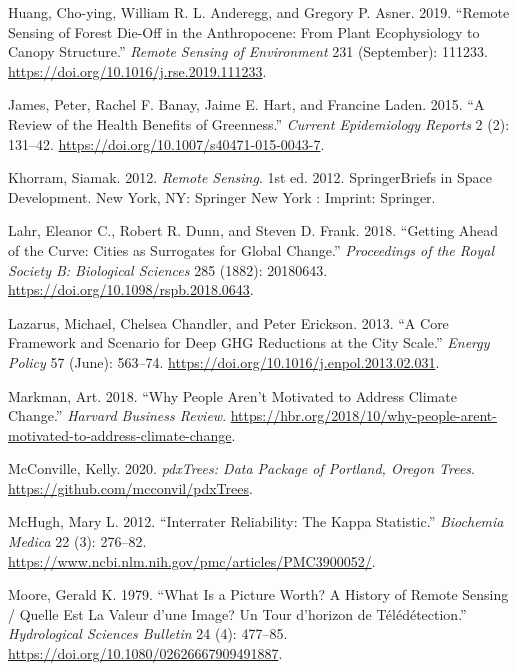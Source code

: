 \documentclass[12pt,twoside]{reedthesis}
\newlength{\cslhangindent}
\newenvironment{CSLReferences}[2] %
 {%
  \setlength{\parindent}{0pt}
  \ifodd #1 \everypar{\setlength{\hangindent}{\cslhangindent}}\ignorespaces\fi
  \ifnum #2 > 0
  \setlength{\parskip}{#2\baselineskip}
  \fi
 }%
 {}
\begin{document}
\begin{CSLReferences}{1}{0}
\leavevmode{}%
Huang, Cho-ying, William R. L. Anderegg, and Gregory P. Asner. 2019. {``Remote Sensing of Forest Die-Off in the Anthropocene: From Plant Ecophysiology to Canopy Structure.''} \emph{Remote Sensing of Environment} 231 (September): 111233. \url{https://doi.org/10.1016/j.rse.2019.111233}.

\leavevmode{}%
James, Peter, Rachel F. Banay, Jaime E. Hart, and Francine Laden. 2015. {``A Review of the Health Benefits of Greenness.''} \emph{Current Epidemiology Reports} 2 (2): 131--42. \url{https://doi.org/10.1007/s40471-015-0043-7}.

\leavevmode{}%
Khorram, Siamak. 2012. \emph{Remote Sensing}. 1st ed. 2012. SpringerBriefs in Space Development. New York, NY: Springer New York : Imprint: Springer.

\leavevmode{}%
Lahr, Eleanor C., Robert R. Dunn, and Steven D. Frank. 2018. {``Getting Ahead of the Curve: Cities as Surrogates for Global Change.''} \emph{Proceedings of the Royal Society B: Biological Sciences} 285 (1882): 20180643. \url{https://doi.org/10.1098/rspb.2018.0643}.

\leavevmode{}%
Lazarus, Michael, Chelsea Chandler, and Peter Erickson. 2013. {``A Core Framework and Scenario for Deep GHG Reductions at the City Scale.''} \emph{Energy Policy} 57 (June): 563--74. \url{https://doi.org/10.1016/j.enpol.2013.02.031}.

\leavevmode{}%
Markman, Art. 2018. {``Why People Aren{'}t Motivated to Address Climate Change.''} \emph{Harvard Business Review}. \url{https://hbr.org/2018/10/why-people-arent-motivated-to-address-climate-change}.

\leavevmode{}%
McConville, Kelly. 2020. \emph{pdxTrees: Data Package of Portland, Oregon Trees}. \url{https://github.com/mcconvil/pdxTrees}.

\leavevmode{}%
McHugh, Mary L. 2012. {``Interrater Reliability: The Kappa Statistic.''} \emph{Biochemia Medica} 22 (3): 276--82. \url{https://www.ncbi.nlm.nih.gov/pmc/articles/PMC3900052/}.

\leavevmode{}%
Moore, Gerald K. 1979. {``What Is a Picture Worth? A History of Remote Sensing / Quelle Est La Valeur d'une Image? Un Tour d'horizon de Télédétection.''} \emph{Hydrological Sciences Bulletin} 24 (4): 477--85. \url{https://doi.org/10.1080/02626667909491887}.


\end{CSLReferences}
\end{document}
